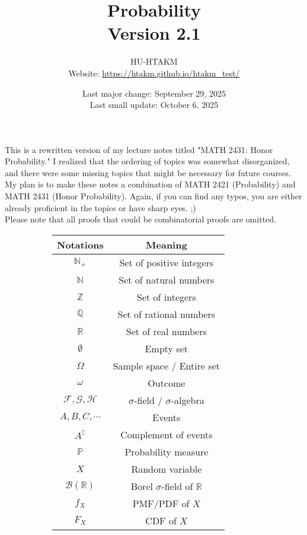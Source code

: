 \documentclass{huhtakm-template-book-v2}
\title{
	\Huge Probability\\
	\small Version 2.1
}
\author{
	HU-HTAKM\\
	\small Website: \url{https://htakm.github.io/htakm_test/}
}
\date{
	Last major change: September 29, 2025\\
	Last small update: October 6, 2025
}
\newcommand{\prob}{\mathbb{P}}
\begin{document}
\maketitle

    This is a rewritten version of my lecture notes titled "MATH 2431: Honor Probability." I realized that the ordering of topics was somewhat disorganized, and there were some missing topics that might be necessary for future courses.\\
    My plan is to make these notes a combination of MATH 2421 (Probability) and MATH 2431 (Honor Probability). Again, if you can find any typos, you are either already proficient in the topics or have sharp eyes. ;)\\
    Please note that all proofs that could be combinatorial proofs are omitted.
    \begin{figure}[h]
        \begin{subfigure}[h]{0.45\textwidth}
            \centering
            \begin{tabular}{cc}
                Notations & Meaning\\
                \hline
                $\mathbb{N}_{+}$ & Set of positive integers\\
                $\mathbb{N}$ & Set of natural numbers\\
                $\mathbb{Z}$ & Set of integers\\
                $\mathbb{Q}$ & Set of rational numbers\\
                $\mathbb{R}$ & Set of real numbers\\
                $\emptyset$ & Empty set\\
                $\Omega$ & Sample space / Entire set\\
                $\omega$ & Outcome\\
                $\mathcal{F},\mathcal{G},\mathcal{H}$ & $\sigma$-field / $\sigma$-algebra\\
                $A,B,C,\cdots$ & Events\\
                $A^{\complement}$ & Complement of events\\
                $\prob$ & Probability measure\\
                $X$ & Random variable\\
                $\mathcal{B}(\mathbb{R})$ & Borel $\sigma$-field of $\mathbb{R}$ \\
                $f_{X}$ & PMF/PDF of $X$\\
                $F_{X}$ & CDF of $X$\\

\end{tabular}
\end{subfigure}
\end{figure}
\end{document}
